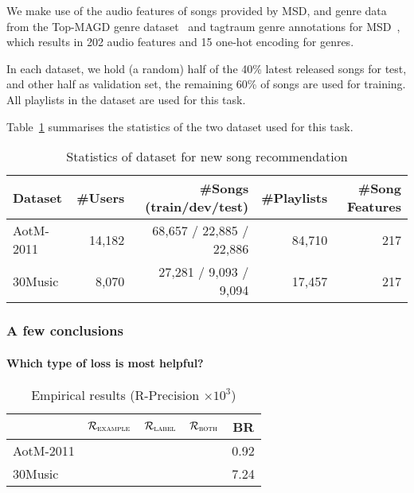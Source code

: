 We make use of the audio features of songs provided by MSD, 
and genre data from the Top-MAGD genre dataset~\cite{schindler2012facilitating} and tagtraum genre annotations for MSD~\cite{schreiber2015improving},
which results in 202 audio features and 15 one-hot encoding for genres.


In each dataset, we hold (a random) half of the 40\% latest released songs for test,
and other half as validation set, the remaining 60\% of songs are used for training.
All playlists in the dataset are used for this task.

Table~\ref{tab:stats_newsongrec} summarises the statistics of the two dataset used for this task.

\begin{table}[!h]
\centering
\caption{Statistics of dataset for new song recommendation}
\label{tab:stats_newsongrec}
\small
\begin{tabular}{l|rrrr}
\toprule
Dataset & \#Users & \#Songs (train/dev/test) & \#Playlists & \#Song Features \\
\midrule
AotM-2011 & 14,182  & 68,657 / 22,885 / 22,886 & 84,710 & 217 \\
30Music   & 8,070   & 27,281 / 9,093 / 9,094   & 17,457 & 217 \\
\bottomrule
\end{tabular}
\end{table}


\subsubsection{A few conclusions}

\paragraph{Which type of loss is most helpful?}
\begin{table}[!h]
\centering
\caption{Empirical results (R-Precision $\times 10^3$)}
\small
\begin{tabular}{l|cccc}
\toprule
{}            & $\mathcal{R}_\textsc{example}$ & $\mathcal{R}_\textsc{label}$ & $\mathcal{R}_\textsc{both}$ & BR \\
\midrule
AotM-2011     &  &  &  & 0.92 \\
30Music       &  &  &  & 7.24 \\
\bottomrule
\end{tabular}
\end{table}

